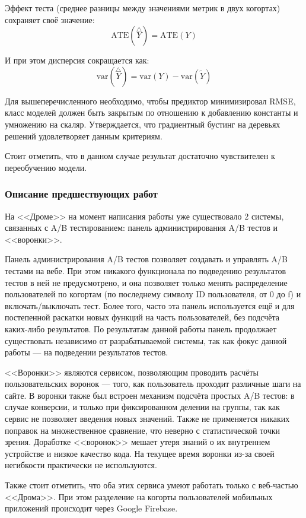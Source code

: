 \documentclass[../document.tex]{subfiles}
\begin{document}
	\par Эффект теста (среднее разницы между значениями метрик в двух когортах) сохраняет своё значение:
	\begin{equation}
		\text{ATE}(\overset{\triangle}{Y})=\text{ATE}(Y)
	\end{equation}
	\par И при этом дисперсия сокращается как:
	\begin{equation}
		\text{var}(\overset{\triangle}{Y})=\text{var}(Y)-\text{var}(\tilde{Y})
	\end{equation}
	\par Для вышеперечисленного необходимо, чтобы предиктор минимизировал RMSE, класс моделей должен быть закрытым по отношению к добавлению константы и умножению на скаляр. Утверждается, что градиентный бустинг на деревьях решений удовлетворяет данным критериям.
	\par Стоит отметить, что в данном случае результат достаточно чувствителен к переобучению модели.
	\subsubsection{Описание предшествующих работ}
	\par На <<Дроме>> на момент написания работы уже существовало 2 системы, связанных с A/B тестированием: панель администрирования A/B тестов и <<воронки>>.
	\par Панель администрирования A/B тестов позволяет создавать и управлять A/B тестами на вебе. При этом никакого функционала по подведению результатов тестов в ней не предусмотрено, и она позволяет только менять распределение пользователей по когортам (по последнему символу ID пользователя, от 0 до f) и включать/выключать тест. Более того, часто эта панель используется ещё и для постепенной раскатки новых функций на часть пользователей, без подсчёта каких-либо результатов. По результатам данной работы панель продолжает существовать независимо от разрабатываемой системы, так как фокус данной работы --- на подведении результатов тестов.
	\par <<Воронки>> являются сервисом, позволяющим проводить расчёты пользовательских воронок --- того, как пользователь проходит различные шаги на сайте. В воронки также был встроен механизм подсчёта простых A/B тестов: в случае конверсии, и только при фиксированном делении на группы, так как сервис не позволяет введения новых значений. Также не применяется никаких поправок на множественное сравнение, что неверно с статистической точки зрения. Доработке <<воронок>> мешает утеря знаний о их внутреннем устройстве и низкое качество кода. На текущее время воронки из-за своей негибкости практически не используются.
	\par Также стоит отметить, что оба этих сервиса умеют работать только с веб-частью <<Дрома>>. При этом разделение на когорты пользователей мобильных приложений происходит через Google Firebase.
\end{document}
